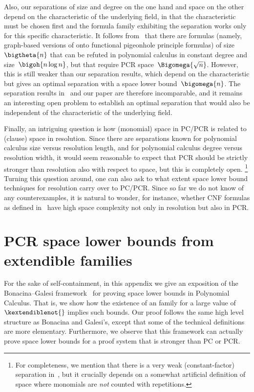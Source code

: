 \documentclass[11pt]{article}
\numberwithin{equation}{section}
\theoremstyle{definition}
\theoremstyle{plain}
\begin{document}
Also, our separations of size and degree on the one hand and space on
the other depend on the characteristic of the 
underlying field, in that the characteristic must be chosen
first and the formula  family exhibiting the separation works only
for this specific characteristic.
It follows from~\cite{GKT19SpaceWidth} that there are formulas
(namely, graph-based versions of onto functional pigeonhole principle
formulas) of size $\bigtheta{n}$ that can be refuted in polynomial
calculus  in constant degree and size~$\bigoh{n \log n}$,
but that require PCR space~$\Bigomega{\sqrt{n}}$.
However, this is still weaker than our separation results, which
depend on the characteristic but gives an optimal separation with a
space lower bound~$\bigomega{n}$. The separation results
in~\cite{GKT19SpaceWidth} and our paper are therefore incomparable,
and it remains an interesting open problem to establish an optimal
separation that would also be independent of the characteristic of the
underlying field.

Finally, an intriguing question is how (monomial) space in PC/PCR is
related to (clause) space in resolution. Since there are separations
known for polynomial calculus size versus resolution length, and for
polynomial calculus degree versus resolution width, it would seem
reasonable to expect that PCR should be strictly stronger than
resolution also with respect to space, but this is completely open.%
\footnote{%
  For completeness, we mention that there is a very weak
  (constant-factor) separation in~\cite{ABRW02SpaceComplexity}, but it
  crucially depends on a somewhat artificial definition of space where
  monomials are \emph{not} counted with repetitions.}  
%
%
Turning this question around, one can also ask to
what extent space lower bound techniques for
resolution carry over to PC/PCR. Since so far we do not know of any
%
counterexamples, %
it is natural to wonder, for instance, whether
 CNF formulas as defined in~%
\cite{ABRW02SpaceComplexity} have high space complexity not only in
resolution but also in PCR.
 
%
%

\appendix
%
\section{PCR space lower bounds from extendible families}
\label{sec:bg-framework}

%
%
%
%
%
For the sake of self-containment, in this appendix we give an
exposition of the Bonacina--Galesi
framework~\cite{BG15Framework} for proving space lower bounds
in Polynomial Calculus. %
That is, we
show how the existence of an
\kextendible family for a large value of $\kextendiblenot{}$
implies such bounds. %
Our proof follows the same high level structure as Bonacina and Galesi's, except that some of the technical definitions are more elementary. Furthermore, we observe that this
framework can actually prove space lower
bounds for a proof system that %
is   %
stronger than PC or PCR.
\end{document}
